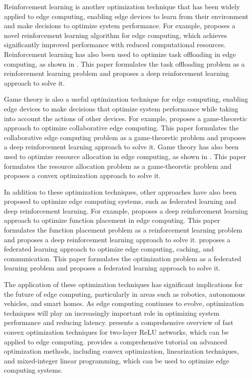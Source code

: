 \documentclass[11pt]{article}
\begin{document}
Reinforcement learning is another optimization technique that has been widely applied to edge computing, enabling edge devices to learn from their environment and make decisions to optimize system performance. For example, \cite{ref83} proposes a novel reinforcement learning algorithm for edge computing, which achieves significantly improved performance with reduced computational resources. Reinforcement learning has also been used to optimize task offloading in edge computing, as shown in \cite{ref84}. This paper formulates the task offloading problem as a reinforcement learning problem and proposes a deep reinforcement learning approach to solve it.

Game theory is also a useful optimization technique for edge computing, enabling edge devices to make decisions that optimize system performance while taking into account the actions of other devices. For example, \cite{ref85} proposes a game-theoretic approach to optimize collaborative edge computing. This paper formulates the collaborative edge computing problem as a game-theoretic problem and proposes a deep reinforcement learning approach to solve it. Game theory has also been used to optimize resource allocation in edge computing, as shown in \cite{ref66}. This paper formulates the resource allocation problem as a game-theoretic problem and proposes a convex optimization approach to solve it.

In addition to these optimization techniques, other approaches have also been proposed to optimize edge computing systems, such as federated learning and deep reinforcement learning. For example, \cite{ref86} proposes a deep reinforcement learning approach to optimize function placement in edge computing. This paper formulates the function placement problem as a reinforcement learning problem and proposes a deep reinforcement learning approach to solve it. \cite{ref80} proposes a federated learning approach to optimize edge computing, caching, and communication. This paper formulates the optimization problem as a federated learning problem and proposes a federated learning approach to solve it.

The application of these optimization techniques has significant implications for the future of edge computing, particularly in areas such as robotics, autonomous vehicles, and smart homes. As edge computing continues to evolve, optimization techniques will play an increasingly important role in optimizing system performance and reducing latency. \cite{ref87} presents a comprehensive overview of fast convex optimization techniques for two-layer ReLU networks, which can be applied to edge computing. \cite{ref88} provides a comprehensive tutorial on advanced optimization methods, including convex optimization, linearization techniques, and mixed-integer linear programming, which can be used to optimize edge computing systems.
\end{document}
